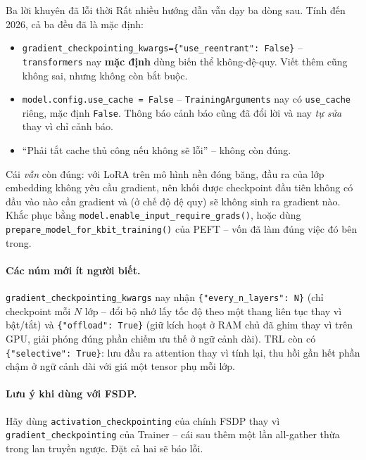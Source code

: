 \begin{pitfall}{Ba lời khuyên đã lỗi thời}
Rất nhiều hướng dẫn vẫn dạy ba dòng sau. Tính đến 2026, cả ba đều đã là mặc định:
\begin{itemize}
	\item \texttt{gradient\_checkpointing\_kwargs=\{"use\_reentrant": False\}} -- \texttt{transformers} nay \textbf{mặc định} dùng biến thể không-đệ-quy. Viết thêm cũng không sai, nhưng không còn bắt buộc.
	\item \texttt{model.config.use\_cache = False} -- \texttt{TrainingArguments} nay có \texttt{use\_cache} riêng, mặc định \texttt{False}. Thông báo cảnh báo cũng đã đổi lời và nay \emph{tự sửa} thay vì chỉ cảnh báo.
	\item “Phải tắt cache thủ công nếu không sẽ lỗi” -- không còn đúng.
\end{itemize}
Cái \emph{vẫn} còn đúng: với LoRA trên mô hình nền đóng băng, đầu ra của lớp embedding không yêu cầu gradient, nên khối được checkpoint đầu tiên không có đầu vào nào cần gradient và (ở chế độ đệ quy) sẽ không sinh ra gradient nào. Khắc phục bằng \texttt{model.\allowbreak enable\_\allowbreak input\_\allowbreak require\_\allowbreak grads(\allowbreak )}, hoặc dùng \texttt{prepare\_\allowbreak model\_\allowbreak for\_\allowbreak kbit\_\allowbreak training(\allowbreak )} của PEFT -- vốn đã làm đúng việc đó bên trong.
\end{pitfall}

\paragraph{Các núm mới ít người biết.} \texttt{gradient\_\allowbreak checkpointing\_\allowbreak kwargs} nay nhận \texttt{\{"every\_\allowbreak n\_\allowbreak layers": N\}} (chỉ checkpoint mỗi $N$ lớp -- đổi bộ nhớ lấy tốc độ theo một thang liên tục thay vì bật/tắt) và \texttt{\{"offload": True\}} (giữ kích hoạt ở RAM chủ đã ghim thay vì trên GPU, giải phóng đúng phần chiếm ưu thế ở ngữ cảnh dài). TRL còn có \texttt{\{"selective": True\}}: lưu đầu ra attention thay vì tính lại, thu hồi gần hết phần chậm ở ngữ cảnh dài với giá một tensor phụ mỗi lớp.

\paragraph{Lưu ý khi dùng với FSDP.} Hãy dùng \texttt{activation\_\allowbreak checkpointing} của chính FSDP thay vì \texttt{gradient\_\allowbreak checkpointing} của Trainer -- cái sau thêm một lần all-gather thừa trong lan truyền ngược. Đặt cả hai sẽ báo lỗi.

